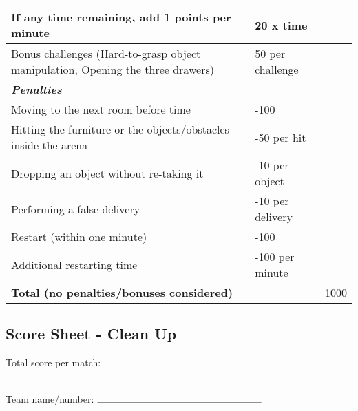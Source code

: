 \documentclass{article}
\begin{document}
\begin{center}
\begin{tabular}{ |m{8cm}|m{3cm}|m{1cm}| }
    \hline
    If any time remaining, add 1 points per minute & 20 x time & \\ 
    \hline
    Bonus challenges (Hard-to-grasp object manipulation, Opening the three drawers) & 50 per challenge & \\ 
    \hline
    \textbf{\textit{Penalties}} & & \\ 
    \hline
    Moving to the next room before time & -100 & \\ 
    \hline
    Hitting the furniture or the objects/obstacles inside the arena & -50 per hit & \\ 
    \hline
    Dropping an object without re-taking it & -10 per object & \\ 
    \hline
    Performing a false delivery & -10 per delivery & \\ 
    \hline
    Restart (within one minute) & -100 & \\ 
    \hline
    Additional restarting time & -100 per minute & \\ 
    \hline
    \hline
    \textbf{Total (no penalties/bonuses considered)} & & 1000 \\ 
    \hline
\end{tabular}
\end{center}
\fi

\clearpage
\subsection{Score Sheet - Clean Up}

Total score per match:\\ \\

\begin{center} Team name/number: $\rule{6cm}{0.15mm}$ \end{center}
\end{document}
